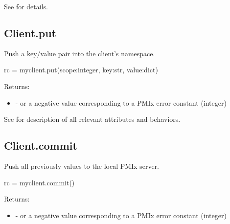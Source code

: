 See  for details.


\subsection{Client.put}

\summary

Push a key/value pair into the client's namespace.

\format

\pyspecificstart
\begin{codepar}
rc = myclient.put(scope:integer, key:str, value:dict)
\end{codepar}
\pyspecificend

\begin{arglist}
\end{arglist}

Returns:

\begin{itemize}
    \item {} -  or a negative value corresponding to a PMIx error constant (integer)
\end{itemize}

See  for description of all relevant attributes and behaviors.


\subsection{Client.commit}

\summary

Push all previously  values to the local PMIx server.

\format

\pyspecificstart
\begin{codepar}
rc = myclient.commit()
\end{codepar}
\pyspecificend

Returns:

\begin{itemize}
    \item {} -  or a negative value corresponding to a PMIx error constant (integer)
\end{itemize}

